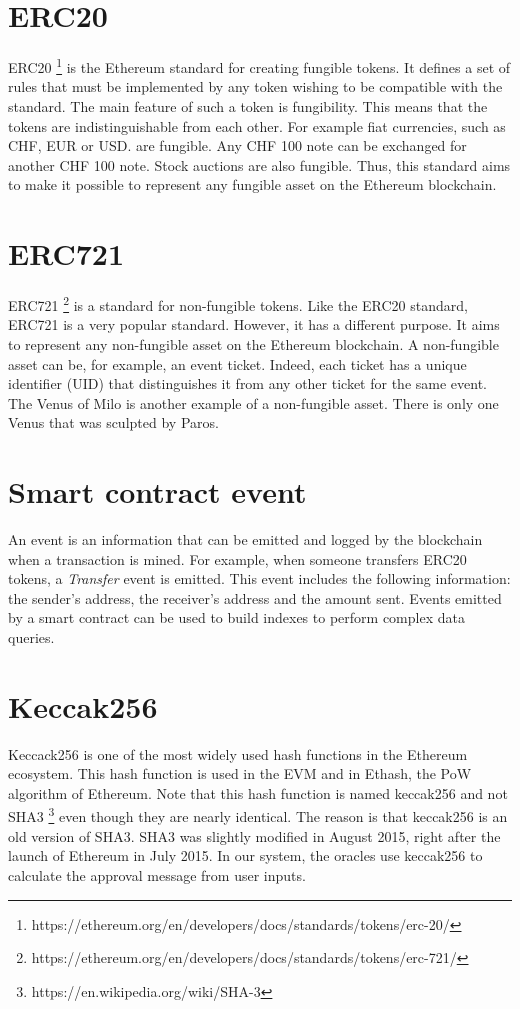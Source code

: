 \documentclass[a4paper,11pt,oneside]{report}
\begin{document}
\section{ERC20}
ERC20 \footnote{https://ethereum.org/en/developers/docs/standards/tokens/erc-20/} is the Ethereum standard for creating fungible tokens. It defines a set of rules that must be implemented by any token wishing to be compatible with the standard. The main feature of such a token is fungibility. This means that the tokens are indistinguishable from each other. For example fiat currencies, such as CHF, EUR or USD. are fungible. Any CHF 100 note can be exchanged for another CHF 100 note. Stock auctions are also fungible. Thus, this standard aims to make it possible to represent any fungible asset on the Ethereum blockchain. 

\section{ERC721}
ERC721 \footnote{https://ethereum.org/en/developers/docs/standards/tokens/erc-721/} is a standard for non-fungible tokens. Like the ERC20 standard, ERC721 is a very popular standard. However, it has a different purpose. It aims to represent any non-fungible asset on the Ethereum blockchain. A non-fungible asset can be, for example, an event ticket. Indeed, each ticket has a unique identifier (UID) that distinguishes it from any other ticket for the same event. The Venus of Milo is another example of a non-fungible asset. There is only one Venus that was sculpted by Paros.

\section{Smart contract event}
An event is an information that can be emitted and logged by the blockchain when a transaction is mined. For example, when someone transfers ERC20 tokens, a \textit{Transfer} event is emitted. This event includes the following information: the sender's address, the receiver's address and the amount sent. Events emitted by a smart contract can be used to build indexes to perform complex data queries.

\section{Keccak256}
Keccack256 is one of the most widely used hash functions in the Ethereum ecosystem. This hash function is used in the EVM and in Ethash, the PoW algorithm of Ethereum. Note that this hash function is named keccak256 and not SHA3 \footnote{https://en.wikipedia.org/wiki/SHA-3} even though they are nearly identical. The reason is that keccak256 is an old version of SHA3. SHA3 was slightly modified in August 2015, right after the launch of Ethereum in July 2015. In our system, the oracles use keccak256 to calculate the approval message from user inputs.
\end{document}
